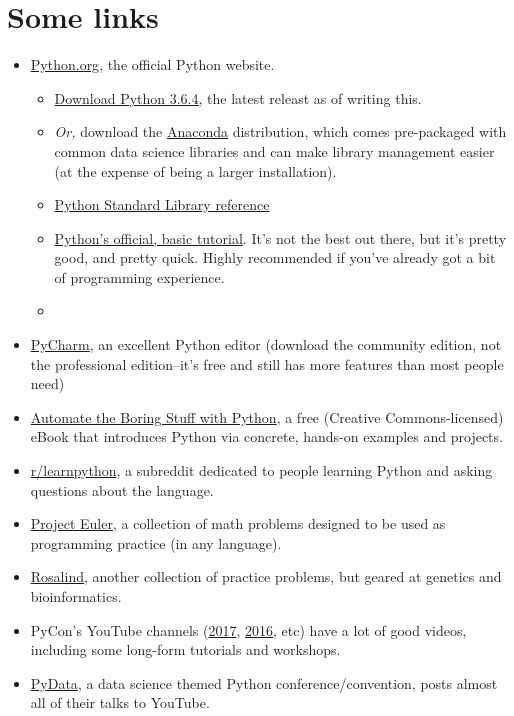 \documentclass[11pt]{article}
\providecommand{\tightlist}{%
      \setlength{\itemsep}{0pt}\setlength{\parskip}{0pt}}
\begin{document}
    \hypertarget{some-links}{%
\section{Some links}\label{some-links}}

\begin{itemize}
\tightlist
\item
  \href{https://www.python.org/}{Python.org}, the official Python
  website.

  \begin{itemize}
  \item
    \href{https://www.python.org/downloads/release/python-364/}{Download
    Python 3.6.4,} the latest releast as of writing this.
  \item
    \emph{Or,} download the \href{https://www.anaconda.com/}{Anaconda}
    distribution, which comes pre-packaged with common data science
    libraries and can make library management easier (at the expense of
    being a larger installation).
  \item
    \href{https://docs.python.org/3/library/index.html}{Python Standard
    Library reference}
  \item
    \href{https://docs.python.org/3/tutorial/index.html}{Python's
    official, basic tutorial}. It's not the best out there, but it's
    pretty good, and pretty quick. Highly recommended if you've already
    got a bit of programming experience.
  \item
  \end{itemize}
\item
  \href{https://www.jetbrains.com/pycharm/}{PyCharm}, an excellent
  Python editor (download the community edition, not the professional
  edition--it's free and still has more features than most people need)
\item
  \href{https://automatetheboringstuff.com/}{Automate the Boring Stuff
  with Python}, a free (Creative Commons-licensed) eBook that introduces
  Python via concrete, hands-on examples and projects.
\item
  \href{https://www.reddit.com/r/learnpython/}{r/learnpython}, a
  subreddit dedicated to people learning Python and asking questions
  about the language.
\item
  \href{https://projecteuler.net/archives}{Project Euler}, a collection
  of math problems designed to be used as programming practice (in any
  language).
\item
  \href{http://rosalind.info/problems/locations/}{Rosalind}, another
  collection of practice problems, but geared at genetics and
  bioinformatics.
\item
  PyCon's YouTube channels
  (\href{https://www.youtube.com/channel/UCrJhliKNQ8g0qoE_zvL8eVg}{2017},
  \href{https://www.youtube.com/channel/UCwTD5zJbsQGJN75MwbykYNw}{2016},
  etc) have a lot of good videos, including some long-form tutorials and
  workshops.
\item
  \href{https://www.youtube.com/user/PyDataTV}{PyData}, a data science
  themed Python conference/convention, posts almost all of their talks
  to YouTube.
\end{itemize}
\end{document}
